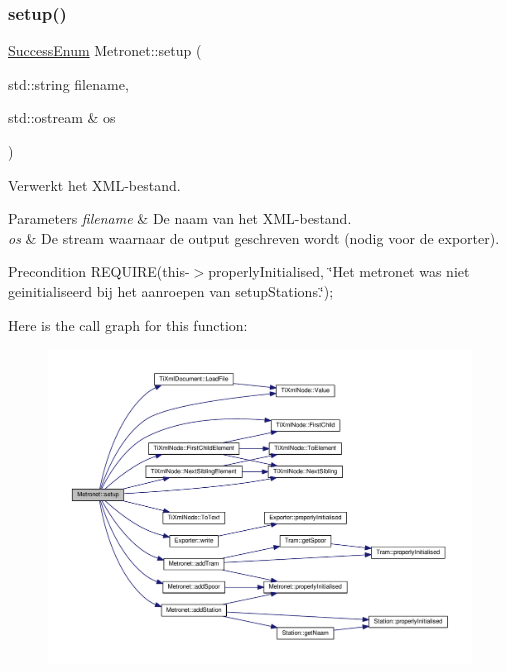 \subsubsection{\texorpdfstring{setup()}{setup()}}
{\footnotesize\ttfamily \hyperlink{_metronet_8h_ae69e1bf070c1c339170236b3fef70a4d}{Success\+Enum} Metronet\+::setup (\begin{DoxyParamCaption}\item[{std\+::string}]{filename,  }\item[{std\+::ostream \&}]{os }\end{DoxyParamCaption})}



Verwerkt het X\+M\+L-\/bestand. 


\begin{DoxyParams}{Parameters}
{\em filename} & De naam van het X\+M\+L-\/bestand. \\
\hline
{\em os} & De stream waarnaar de output geschreven wordt (nodig voor de exporter). \\
\hline
\end{DoxyParams}
\begin{DoxyPrecond}{Precondition}
R\+E\+Q\+U\+I\+RE(this-\/$>$properly\+Initialised, \char`\"{}\+Het metronet was niet geinitialiseerd bij het aanroepen van setup\+Stations.\char`\"{}); 
\end{DoxyPrecond}
Here is the call graph for this function\+:\nopagebreak
\begin{figure}[H]
\begin{center}
\leavevmode
\includegraphics[width=350pt]{class_metronet_ad12d6e52c7f5c23d23e87992b4abc1fa_cgraph}
\end{center}
\end{figure}

